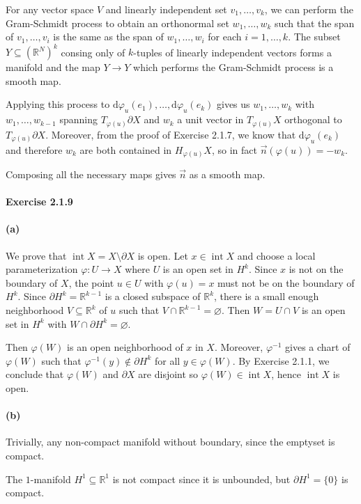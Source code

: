 \documentclass[12pt]{article}
\newcommand{\pnum}[1]{\paragraph{#1}}
\theoremstyle{definition}
\newcommand{\R}{\mathbb{R}}
\renewcommand{\phi}{\varphi}
\renewcommand{\emptyset}{\varnothing}
\newcommand{\<}{\langle}
\renewcommand{\>}{\rangle}
\newcommand{\seq}{\subseteq}
\newcommand{\dd}{\mathrm{d}}
\newcommand{\bd}{\partial}
\DeclareMathOperator{\inter}{int}
\begin{document}
For any vector space $V$ and linearly independent set $v_1, \dots, v_k$, we can perform the Gram-Schmidt process to obtain an orthonormal set $w_1, \dots, w_k$ such that the span of $v_1, \dots, v_i$ is the same as the span of $w_1, \dots, w_i$ for each $i = 1, \dots, k$.
The subset $Y \seq (\R^N)^k$ consing only of $k$-tuples of linearly independent vectors forms a manifold and the map $Y \to Y$ which performs the Gram-Schmidt process is a smooth map.

Applying this process to $\dd{\phi}_u(e_1), \dots, \dd{\phi}_u(e_k)$ gives us $w_1, \dots, w_k$ with $w_1, \dots, w_{k-1}$ spanning $T_{\phi(u)}\bd X$ and $w_k$ a unit vector in $T_{\phi(u)}X$ orthogonal to $T_{\phi(u)}\bd X$.
Moreover, from the proof of Exercise 2.1.7, we know that $\dd{\phi}_u(e_k)$ and therefore $w_k$ are both contained in $H_{\phi(u)}X$, so in fact $\vec{n}(\phi(u)) = -w_k$.

Composing all the necessary maps gives $\vec{n}$ as a smooth map.

\pnum{Exercise 2.1.9}

\pnum{(a)}

We prove that $\inter X = X \setminus \bd X$ is open.
Let $x \in \inter X$ and choose a local parameterization $\phi : U \to X$ where $U$ is an open set in $H^k$.
Since $x$ is not on the boundary of $X$, the point $u \in U$ with $\phi(u) = x$ must not be on the boundary of $H^k$.
Since $\bd H^k = \R^{k-1}$ is a closed subspace of $\R^k$, there is a small enough neighborhood $V \seq \R^k$ of $u$ such that $V \cap \R^{k-1} = \emptyset$.
Then $W = U \cap V$ is an open set in $H^k$ with $W \cap \bd H^k = \emptyset$.

Then $\phi(W)$ is an open neighborhood of $x$ in $X$.
Moreover, $\phi^{-1}$ gives a chart of $\phi(W)$ such that $\phi^{-1}(y) \notin \bd H^k$ for all $y \in \phi(W)$.
By Exercise 2.1.1, we conclude that $\phi(W)$ and $\bd X$ are disjoint so $\phi(W) \in \inter X$, hence $\inter X$ is open.


\pnum{(b)}

Trivially, any non-compact manifold without boundary, since the emptyset is compact.

The $1$-manifold $H^1 \seq \R^1$ is not compact since it is unbounded, but $\bd H^1 = \{0\}$ is compact.
\end{document}
